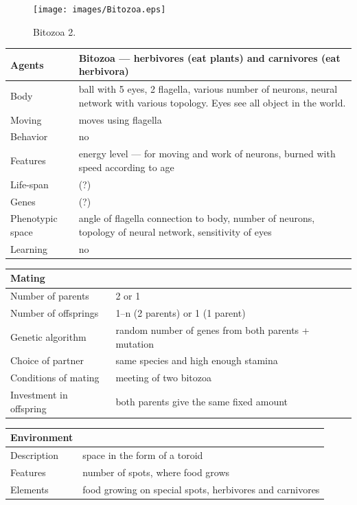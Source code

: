 \documentclass[a4paper,12pt]{report}
\begin{document}
\begin{figure}
\begin{center}
  \texttt{[image: images/Bitozoa.eps]}
  \caption{Bitozoa 2.}
  \label{img.Bitozoa}
\end{center}
\end{figure}

\vspace{20pt}
\begin{tabular}{|p{150pt}|p{220pt}|}
\hline
\textbf{Agents}&Bitozoa --- herbivores (eat plants) and carnivores (eat herbivora)\\ \hline
Body&ball with 5 eyes, 2 flagella, various number of neurons, neural network with various topology. Eyes see all object in the world.\\ \hline
Moving&moves using flagella\\ \hline
Behavior&no\\ \hline
Features&energy level --- for moving and work of neurons, burned with speed according to age \\ \hline
Life-span&(?)\\ \hline
Genes&(?)\\ \hline
Phenotypic space&angle of flagella connection to body, number of neurons, topology of neural network, sensitivity of eyes\\ \hline
Learning&no\\ \hline
\end{tabular} 

\vspace{10pt}
\begin{tabular}{|p{150pt}|p{220pt}|}
\hline 	\textbf  {Mating}&\\ \hline
Number of parents&2 or 1\\ \hline
Number of offsprings&1--n (2 parents) or 1 (1 parent)\\ \hline
Genetic algorithm&random number of genes from both parents + mutation\\ \hline
Choice of partner&same species and high enough stamina\\ \hline
Conditions of mating&meeting of two bitozoa \\ \hline
Investment in offspring&both parents give the same fixed amount\\ \hline
\end{tabular} 

\vspace{10pt}
\begin{tabular}{|p{150pt}|p{220pt}|}
\hline 	\textbf  {Environment}&\\ \hline
Description&space in the form of a toroid\\ \hline
Features&number of spots, where food grows\\ \hline
Elements&food growing on special spots, herbivores and carnivores\\ \hline
\end{tabular}
 
\end{document}
